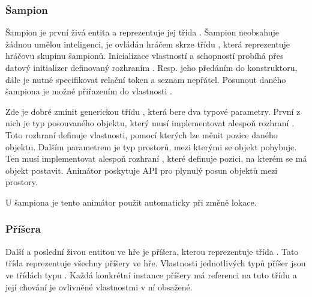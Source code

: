 \subsubsection{Šampion}
Šampion je první živá
entita a reprezentuje jej třída . Šampion neobsahuje žádnou umělou inteligenci, je ovládán hráčem skrze
třídu , která reprezentuje hráčovu skupinu šampionů. Inicializace vlastností a schopností probíhá přes
datový initializer definovaný rozhraním . Resp. jeho předáním do konstruktoru, dále je nutné
specifikovat relační token a seznam nepřátel. Posunout daného šampiona je možné přiřazením do vlastnosti .

Zde je dobré zmínit generickou třídu , která bere dva typové parametry. První z nich je typ posouvaného 
objektu, který musí implementovat alespoň rozhraní . Toto  rozhraní definuje vlastnosti, pomocí kterých lze měnit
pozice daného objektu. Dalším parametrem je typ prostorů, mezi kterými se objekt pohybuje. Ten musí implementovat alespoň 
rozhraní , které definuje pozici, na kterém se má objekt postavit. Animátor poskytuje API pro plynulý
posun objektů mezi prostory.

U šampiona je tento animátor použit automaticky při změně lokace.

\subsubsection{Příšera}
Další a poslední živou entitou ve hře je příšera, kterou reprezentuje třída . Tato třída reprezentuje všechny 
příšery ve hře. Vlastnosti jednotlivých typů příšer jsou ve třídách typu . Každá konkrétní instance 
příšery má referenci na tuto třídu a její chování je ovlivněné vlastnostmi v ní obsažené. 

